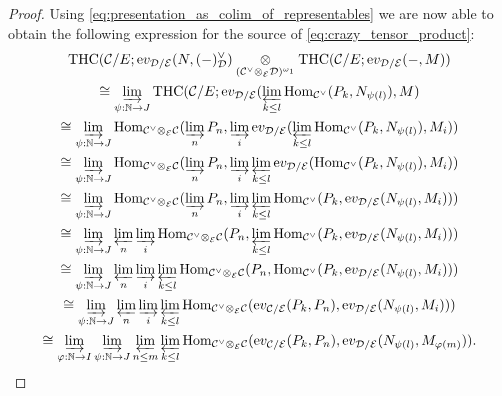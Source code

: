 \documentclass[11pt,leqno]{amsart}
\numberwithin{equation}{section}
\def\N{\mathbb{N}}
\def\Hom{\operatorname{Hom}}
\newcommand{\tens}[1]{%
  \mathbin{\mathop{\otimes}\displaylimits_{#1}}%
}
\newcommand{\indlim}[1][]{\mathop{\varinjlim}\limits_{#1}}
\newcommand{\prolim}[1][]{\mathop{\varprojlim}\limits_{#1}}
\newcommand{\ev}{\mathrm ev}
\newcommand{\cD}{{\mathcal D}}
\newcommand{\cC}{{\mathcal C}}
\newcommand{\cE}{{\mathcal E}}
\newcommand{\THC}{\operatorname{THC}}
\begin{document}
\begin{proof}
Using \eqref{eq:presentation_as_colim_of_representables} we are now able to obtain the following expression for the source of \eqref{eq:crazy_tensor_product}:
\begin{multline}\label{eq:intermediate_expr_for_tensor_product}
\THC(\cC/E;\ev_{\cD/\cE}(N,(-)_{\cD}^{\vee})\tens{(\cC^{\vee}\tens{\cE}\cD)^{\omega_1}} \THC(\cC/E;\ev_{\cD/\cE}(-,M))\\
\cong \indlim[\psi:\N\to J] \THC(\cC/E;\ev_{\cD/\cE}(\prolim[k\leq l] \Hom_{\cC^{\vee}}(P_k,N_{\psi(l)}),M)\\
\cong \indlim[\psi:\N\to J] \Hom_{\cC^{\vee}\tens{\cE}\cC}(\indlim[n] P_n,\indlim[i] \ev_{\cD/\cE}(\prolim[k\leq l] \Hom_{\cC^{\vee}}(P_k,N_{\psi(l)}),M_i))\\
\cong \indlim[\psi:\N\to J] \Hom_{\cC^{\vee}\tens{\cE}\cC}(\indlim[n] P_n,\indlim[i] \prolim[k\leq l] \ev_{\cD/\cE}(\Hom_{\cC^{\vee}}(P_k,N_{\psi(l)}),M_i))\\
\cong \indlim[\psi:\N\to J] \Hom_{\cC^{\vee}\tens{\cE}\cC}(\indlim[n] P_n,\indlim[i] \prolim[k\leq l] \Hom_{\cC^{\vee}}(P_k,\ev_{\cD/\cE}(N_{\psi(l)},M_i)))\\
\cong \indlim[\psi:\N\to J] \prolim[n] \indlim[i] \Hom_{\cC^{\vee}\tens{\cE}\cC}(P_n,\prolim[k\leq l] \Hom_{\cC^{\vee}}(P_k,\ev_{\cD/\cE}(N_{\psi(l)},M_i)))\\
\cong \indlim[\psi:\N\to J] \prolim[n] \indlim[i] \prolim[k\leq l] \Hom_{\cC^{\vee}\tens{\cE}\cC}(P_n,\Hom_{\cC^{\vee}}(P_k,\ev_{\cD/\cE}(N_{\psi(l)},M_i)))\\
\cong \indlim[\psi:\N\to J] \prolim[n] \indlim[i] \prolim[k\leq l] \Hom_{\cC^{\vee}\tens{\cE}\cC}(\ev_{\cC/\cE}(P_k,P_n),\ev_{\cD/\cE}(N_{\psi(l)},M_i))) \\
\cong \indlim[\varphi:\N\to I]\indlim[\psi:\N\to J] \prolim[n\leq m]\prolim[k\leq l]\Hom_{\cC^{\vee}\tens{\cE}\cC}(\ev_{\cC/\cE}(P_k,P_n),\ev_{\cD/\cE}(N_{\psi(l)},M_{\varphi(m)})).
\end{multline}


\end{proof}
\end{document}
